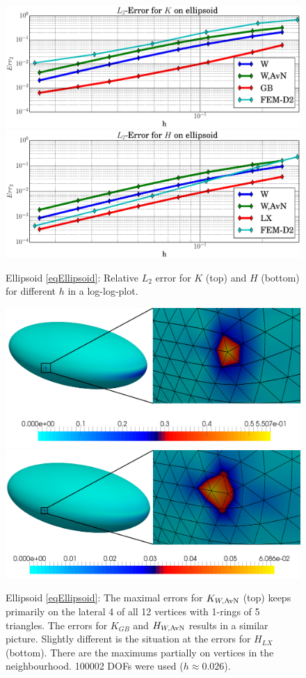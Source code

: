   \begin{figure}
    \centering\includegraphics[width=.49\textwidth]{bilder/ellipsoid/L2K.eps}
    \centering\includegraphics[width=.49\textwidth]{bilder/ellipsoid/L2H.eps}
    \caption{Ellipsoid \eqref{eqEllipsoid}: Relative \( L_{2} \) error for \( K \) (top) and
                                                     \( H \) (bottom) for different \( h \) in a log-log-plot.}
    \label{figEllipsoidL2Err}
  \end{figure}

  \begin{figure}
    \centering\includegraphics[width=.49\textwidth]{bilder/ellipsoid/ErrView.jpg}
    \centering\includegraphics[width=.49\textwidth]{bilder/ellipsoid/ErrViewHLX.jpg}
    \caption{Ellipsoid \eqref{eqEllipsoid}:
                  The maximal errors for \( K_{W,\text{AvN}} \) (top) keeps primarily  on the lateral 4 of all 12 vertices with 1-rings of 5 triangles.
                  The errors for \( K_{GB} \) and \( H_{W,\text{AvN}} \) results in a similar picture.
                  Slightly different is the situation at the errors for \( H_{LX} \) (bottom).
                  There are the maximums partially on vertices in the neighbourhood. 
                  100002 DOFs were used (\( h\approx 0.026 \)).}
    \label{figEllipsoidErrView}
  \end{figure}


